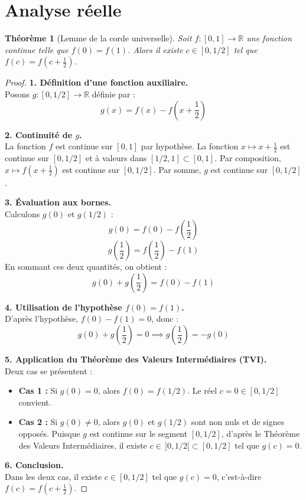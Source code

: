 \documentclass[11pt,a4paper]{article}
\newtheorem{theorem}{Théorème}[section]
\begin{document}
\section{Analyse réelle}

\begin{theorem}[Lemme de la corde universelle]
Soit $f : [0,1] \to \mathbb{R}$ une fonction continue telle que $f(0) = f(1)$. 
Alors il existe $c \in [0, 1/2]$ tel que $f(c) = f\left(c + \frac{1}{2}\right)$.
\end{theorem}

\begin{proof}
\noindent
\textbf{1. Définition d'une fonction auxiliaire.} \\
Posons $g : [0, 1/2] \to \mathbb{R}$ définie par :
\[ g(x) = f(x) - f\left(x + \frac{1}{2}\right) \]

\textbf{2. Continuité de $g$.} \\
La fonction $f$ est continue sur $[0,1]$ par hypothèse. La fonction $x \mapsto x + \frac{1}{2}$ est continue sur $[0, 1/2]$ et à valeurs dans $[1/2, 1] \subset [0,1]$. Par composition, $x \mapsto f\left(x + \frac{1}{2}\right)$ est continue sur $[0, 1/2]$. Par somme, $g$ est continue sur $[0, 1/2]$.

\textbf{3. Évaluation aux bornes.} \\
Calculons $g(0)$ et $g(1/2)$ :
\[ g(0) = f(0) - f\left(\frac{1}{2}\right) \]
\[ g\left(\frac{1}{2}\right) = f\left(\frac{1}{2}\right) - f(1) \]
En sommant ces deux quantités, on obtient :
\[ g(0) + g\left(\frac{1}{2}\right) = f(0) - f(1) \]

\textbf{4. Utilisation de l'hypothèse $f(0) = f(1)$.} \\
D'après l'hypothèse, $f(0) - f(1) = 0$, donc :
\[ g(0) + g\left(\frac{1}{2}\right) = 0 \implies g\left(\frac{1}{2}\right) = -g(0) \]

\textbf{5. Application du Théorème des Valeurs Intermédiaires (TVI).} \\
Deux cas se présentent :
\begin{itemize}
    \item \textbf{Cas 1 :} Si $g(0) = 0$, alors $f(0) = f(1/2)$. Le réel $c = 0 \in [0, 1/2]$ convient.
    \item \textbf{Cas 2 :} Si $g(0) \neq 0$, alors $g(0)$ et $g(1/2)$ sont non nuls et de signes opposés. Puisque $g$ est continue sur le segment $[0, 1/2]$, d'après le Théorème des Valeurs Intermédiaires, il existe $c \in \, ]0, 1/2[ \subset [0, 1/2]$ tel que $g(c) = 0$.
\end{itemize}

\textbf{6. Conclusion.} \\
Dans les deux cas, il existe $c \in [0, 1/2]$ tel que $g(c) = 0$, c'est-à-dire $f(c) = f\left(c + \frac{1}{2}\right)$.
\end{proof}
\end{document}

